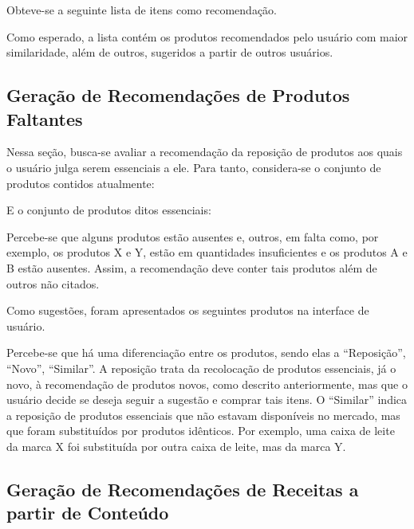 Obteve-se a seguinte lista de itens como recomendação.


Como esperado, a lista contém os produtos recomendados pelo usuário com maior similaridade, além de outros, sugeridos a partir de outros usuários.

\subsection{Geração de Recomendações de Produtos Faltantes}

Nessa seção, busca-se avaliar a recomendação da reposição de produtos aos quais o usuário julga serem essenciais a ele. Para tanto, considera-se o conjunto de produtos contidos atualmente:


E o conjunto de produtos ditos essenciais:


Percebe-se que alguns produtos estão ausentes e, outros, em falta como, por exemplo, os produtos X e Y, estão em quantidades insuficientes e os produtos A e B estão ausentes. Assim, a recomendação deve conter tais produtos além de outros não citados.

Como sugestões, foram apresentados os seguintes produtos na interface de usuário.


Percebe-se que há uma diferenciação entre os produtos, sendo elas a ``Reposição'', ``Novo'', ``Similar''. A reposição trata da recolocação de produtos essenciais, já o novo, à recomendação de produtos novos, como descrito anteriormente, mas que o usuário decide se deseja seguir a sugestão e comprar tais itens. O ``Similar'' indica a reposição de produtos essenciais que não estavam disponíveis no mercado, mas que foram substituídos por produtos idênticos. Por exemplo, uma caixa de leite da marca X foi substituída por outra caixa de leite, mas da marca Y.

\subsection{Geração de Recomendações de Receitas a partir de Conteúdo}

